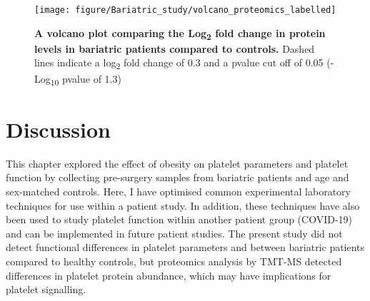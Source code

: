 \documentclass[11pt,twoside]{bristolthesis}
\begin{document}
\begin{figure}

{\centering \texttt{[image: figure/Bariatric\_study/volcano\_proteomics\_labelled]} 

}

\caption[A volcano plot comparing the Log\textsubscript{2} fold change in protein levels in bariatric patients compared to controls]{\textbf{A volcano plot comparing the Log\textsubscript{2} fold change in protein levels in bariatric patients compared to controls.} Dashed lines indicate a log\textsubscript{2} fold change of 0.3 and a pvalue cut off of 0.05 (-Log\textsubscript{10} pvalue of 1.3)}\label{fig:volcano}
\end{figure}
\hypertarget{discussion-1}{%
\section{Discussion}\label{discussion-1}}

This chapter explored the effect of obesity on platelet parameters and platelet function by collecting pre-surgery samples from bariatric patients and age and sex-matched controls. Here, I have optimised common experimental laboratory techniques for use within a patient study. In addition, these techniques have also been used to study platelet function within another patient group (COVID-19) and can be implemented in future patient studies. The present study did not detect functional differences in platelet parameters and between bariatric patients compared to healthy controls, but proteomics analysis by TMT-MS detected differences in platelet protein abundance, which may have implications for platelet signalling.
\end{document}
